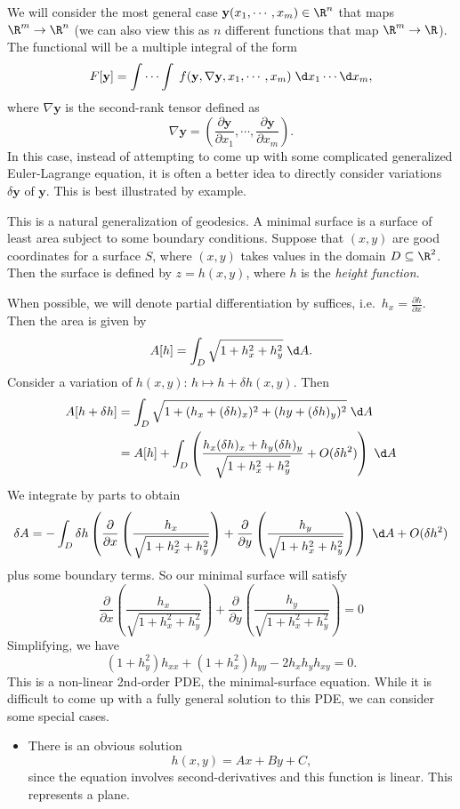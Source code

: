 \documentclass[a4paper]{article}
\begin{document}
We will consider the most general case $\mathbf{y}(x_1, \cdots, x_m) \in \R^n$ that maps $\R^m \to \R^n$ (we can also view this as $n$ different functions that map $\R^m \to \R$). The functional will be a multiple integral of the form
\[
  F[\mathbf{y}] = \int\cdots \int \; f(\mathbf{y}, \nabla \mathbf{y}, x_1, \cdots, x_m)\;\d x_1\cdots \d x_m,
\]
where $\nabla \mathbf{y}$ is the second-rank tensor defined as
\[
  \nabla \mathbf{y} = \left(\frac{\partial \mathbf{y}}{\partial x_1}, \cdots, \frac{\partial \mathbf{y}}{\partial x_m}\right).
\]
In this case, instead of attempting to come up with some complicated generalized Euler-Lagrange equation, it is often a better idea to directly consider variations $\delta \mathbf{y}$ of $\mathbf{y}$. This is best illustrated by example.

\begin{eg}
  This is a natural generalization of geodesics. A minimal surface is a surface of least area subject to some boundary conditions. Suppose that $(x, y)$ are good coordinates for a surface $S$, where $(x, y)$ takes values in the domain $D \subseteq \R^2$. Then the surface is defined by $z = h(x, y)$, where $h$ is the \emph{height function}.

  When possible, we will denote partial differentiation by suffices, i.e.\ $h_x = \frac{\partial h}{\partial x}$. Then the area is given by
  \[
    A[h] = \int_D \sqrt{1 + h_x^2 + h_y^2}\;\d A.
  \]
  Consider a variation of $h(x, y)$: $h\mapsto h + \delta h(x, y)$. Then
  \begin{align*}
    A[h + \delta h] &= \int_D \sqrt{1 + (h_x + (\delta h)_x)^2 + (hy + (\delta h)_y)^2}\;\d A\\
    &= A[h] + \int_D \left(\frac{h_x (\delta h)_x + h_y (\delta h)_y}{\sqrt{1 + h_x^2 + h_y^2}} + O(\delta h^2)\right)\;\d A
  \end{align*}
  We integrate by parts to obtain
  \[
    \delta A = -\int_D \delta h\left(\frac{\partial}{\partial x} \left(\frac{h_x}{\sqrt{1 + h_x^2 + h_y^2}}\right) + \frac{\partial}{\partial y} \left(\frac{h_y}{\sqrt{1 + h_x^2 + h_y^2}}\right)\right)\;\d A + O(\delta h^2)
  \]
  plus some boundary terms. So our minimal surface will satisfy
  \[
    \frac{\partial}{\partial x} \left(\frac{h_x}{\sqrt{1 + h_x^2 + h_y^2}}\right) + \frac{\partial}{\partial y} \left(\frac{h_y}{\sqrt{1 + h_x^2 + h_y^2}}\right) = 0
  \]
  Simplifying, we have
  \[
    (1 + h_y^2)h_{xx} + (1 + h_x^2) h_{yy} - 2h_xh_y h_{xy} = 0.
  \]
  This is a non-linear 2nd-order PDE, the minimal-surface equation. While it is difficult to come up with a fully general solution to this PDE, we can consider some special cases.
  \begin{itemize}
    \item There is an obvious solution
      \[
        h(x, y) = Ax + By + C,
      \]
      since the equation involves second-derivatives and this function is linear. This represents a plane.


\end{itemize}
\end{eg}
\end{document}
